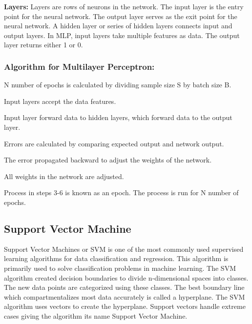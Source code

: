 \vspace{-1em}
\textbf{Layers:}
Layers are rows of neurons in the network. The input layer is the entry point for the neural network. The output layer serves as the exit point for the neural network. A hidden layer or series of hidden layers connects input and output layers. In MLP, input layers take multiple
features as data. The output layer returns either 1 or 0.

\subsubsection{Algorithm for Multilayer Perceptron:}
\begin{steps}
  \vspace{-0.5em}
  \setlength{\itemsep}{-0.2em}
  \item N number of epochs is calculated by dividing sample size S by batch size B.
  \item Input layers accept the data features.
  \item Input layer forward data to hidden layers, which forward data to the output layer.
  \item Errors are calculated by comparing expected output and network output.
  \item The error propagated backward to adjust the weights of the network.
  \item All weights in the network are adjusted.
  \item Process in steps 3-6 is known as an epoch. The process is run for N number of epochs.
  \vspace{-1em}
\end{steps}

\vspace{-2em}
\subsection{Support Vector Machine} \label{subsec:support_vector_machine}
Support Vector Machines or SVM is one of the most commonly used supervised learning algorithms for data classification and regression. This algorithm is primarily used to solve classification problems in machine learning. The SVM algorithm created decision boundaries to divide n-dimensional spaces into classes. The new data points are categorized using these classes. The best boundary line which compartmentalizes most data accurately is called a hyperplane. The SVM algorithm uses vectors to create the hyperplane. Support vectors handle extreme cases giving the algorithm its name Support Vector Machine.


